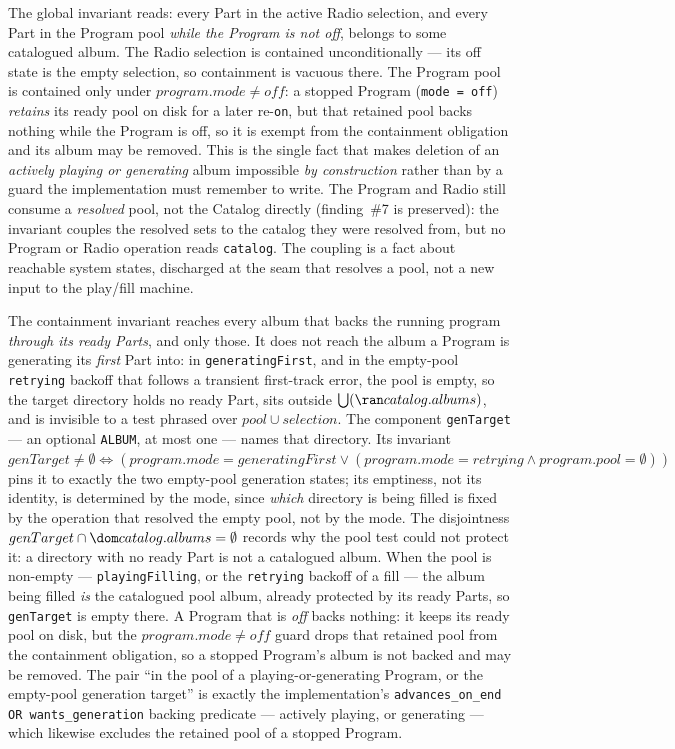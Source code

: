 \documentclass[a4paper,10pt,fleqn]{article}
\begin{document}
The global invariant reads: every Part in the active Radio selection, and every
Part in the Program pool \emph{while the Program is not off}, belongs to some
catalogued album. The Radio selection is contained unconditionally --- its off
state is the empty selection, so containment is vacuous there. The Program pool
is contained only under $program.mode \neq off$: a stopped Program
(\texttt{mode = off}) \emph{retains} its ready pool on disk for a later
re-\texttt{on}, but that retained pool backs nothing while the Program is off,
so it is exempt from the containment obligation and its album may be removed.
This is the single fact that makes deletion of an \emph{actively playing or
generating} album impossible \emph{by construction} rather than by a guard the
implementation must remember to write. The Program and Radio
still consume a \emph{resolved} pool, not the Catalog directly (finding~\#7 is
preserved): the invariant couples the resolved sets to the catalog they were
resolved from, but no Program or Radio operation reads \texttt{catalog}. The
coupling is a fact about reachable system states, discharged at the seam that
resolves a pool, not a new input to the play/fill machine.

The containment invariant reaches every album that backs the running program
\emph{through its ready Parts}, and only those. It does not reach the album a
Program is generating its \emph{first} Part into: in \texttt{generatingFirst},
and in the empty-pool \texttt{retrying} backoff that follows a transient
first-track error, the pool is empty, so the target directory holds no ready
Part, sits outside $\bigcup (\ran catalog.albums)$, and is invisible to a test
phrased over $pool \cup selection$. The component \texttt{genTarget} --- an
optional \texttt{ALBUM}, at most one --- names that directory. Its invariant
$genTarget \neq \emptyset \iff (program.mode = generatingFirst \lor
(program.mode = retrying \land program.pool = \emptyset))$ pins it to exactly the
two empty-pool generation states; its emptiness, not its identity, is
determined by the mode, since \emph{which} directory is being filled is fixed by
the operation that resolved the empty pool, not by the mode. The disjointness
$genTarget \cap \dom catalog.albums = \emptyset$ records why the pool test could
not protect it: a directory with no ready Part is not a catalogued album. When
the pool is non-empty --- \texttt{playingFilling}, or the \texttt{retrying}
backoff of a fill --- the album being filled \emph{is} the catalogued pool
album, already protected by its ready Parts, so \texttt{genTarget} is empty
there. A Program that is \emph{off} backs nothing: it keeps its ready pool on
disk, but the $program.mode \neq off$ guard drops that retained pool from the
containment obligation, so a stopped Program's album is not backed and may be
removed. The pair ``in the pool of a playing-or-generating Program, or the
empty-pool generation target'' is exactly the implementation's
\texttt{advances\_on\_end OR wants\_generation} backing predicate --- actively
playing, or generating --- which likewise excludes the retained pool of a
stopped Program.
\end{document}
